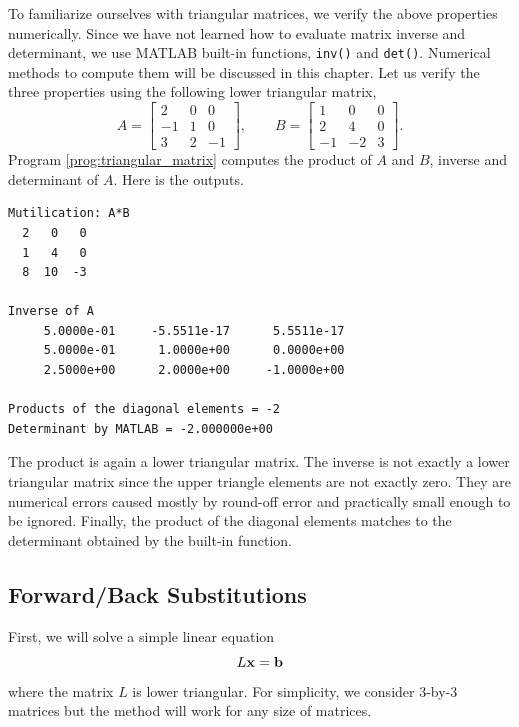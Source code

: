 \begin{example}
To familiarize ourselves with triangular matrices, we verify the above properties numerically.
Since we have not learned how to evaluate matrix inverse and determinant,  we use MATLAB built-in functions, \texttt{inv()} and \texttt{det()}. Numerical methods to compute them will be discussed in this chapter.
Let us verify the three properties using the following lower triangular matrix,
\begin{equation}
A = \begin{bmatrix}
2 & 0 & 0 \\ -1 & 1& 0\\ 3 & 2 & -1 
\end{bmatrix}, \qquad
B = \begin{bmatrix}
1 & 0 & 0 \\ 2 & 4& 0\\ -1 & -2 & 3 
\end{bmatrix}.
\end{equation}
Program \ref{prog:triangular_matrix} computes the product of $A$ and $B$, inverse and determinant of $A$.  Here is the outputs.
\begin{mybox}

\small
\begin{verbatim}
Mutilication: A*B
  2   0   0
  1   4   0
  8  10  -3

Inverse of A
     5.0000e-01     -5.5511e-17      5.5511e-17
     5.0000e-01      1.0000e+00      0.0000e+00
     2.5000e+00      2.0000e+00     -1.0000e+00

Products of the diagonal elements = -2
Determinant by MATLAB = -2.000000e+00
\end{verbatim}
\normalsize
\end{mybox}
The product is again a lower triangular matrix.  The inverse is not exactly a lower triangular matrix since the upper triangle elements are not exactly zero. They are numerical errors caused mostly by round-off error and  practically small enough to be ignored.  Finally, the product of the diagonal elements matches to the determinant obtained by the built-in function.
\end{example}

\noindent
\subsection{Forward/Back Substitutions}
First, we will solve a simple linear equation 
\begin{equation}\label{eq:Lx=b}
L \vb{x} = \vb{b}
\end{equation}
where the matrix $L$ is lower triangular.   For simplicity, we consider 3-by-3 matrices but the method will work for any size of matrices.

